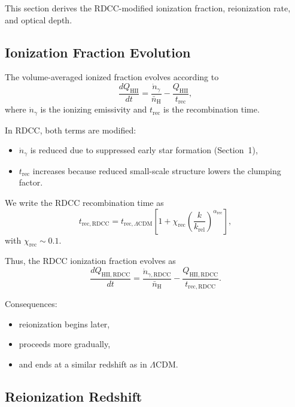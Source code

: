 \documentclass[11pt,a4paper]{article}
\begin{document}
This section derives the RDCC-modified ionization fraction, reionization rate, and optical
depth.

\subsection{Ionization Fraction Evolution}

The volume-averaged ionized fraction evolves according to
\begin{equation}
\frac{dQ_{\mathrm{HII}}}{dt}
=
\frac{\dot{n}_{\gamma}}{\bar{n}_{\mathrm{H}}}
-
\frac{Q_{\mathrm{HII}}}{t_{\mathrm{rec}}},
\end{equation}
where $\dot{n}_{\gamma}$ is the ionizing emissivity and $t_{\mathrm{rec}}$ is the recombination time.

In RDCC, both terms are modified:
\begin{itemize}
\item $\dot{n}_{\gamma}$ is reduced due to suppressed early star formation (Section~1),
\item $t_{\mathrm{rec}}$ increases because reduced small-scale structure lowers the clumping factor.
\end{itemize}

We write the RDCC recombination time as
\begin{equation}
t_{\mathrm{rec,RDCC}}
=
t_{\mathrm{rec},\Lambda\mathrm{CDM}}
\left[
1
+
\chi_{\mathrm{rec}}
\left(
\frac{k}{k_{\mathrm{rel}}}
\right)^{\alpha_{\mathrm{rec}}}
\right],
\end{equation}
with $\chi_{\mathrm{rec}} \sim 0.1$.

Thus, the RDCC ionization fraction evolves as
\begin{equation}
\frac{dQ_{\mathrm{HII,RDCC}}}{dt}
=
\frac{\dot{n}_{\gamma,\mathrm{RDCC}}}{\bar{n}_{\mathrm{H}}}
-
\frac{Q_{\mathrm{HII,RDCC}}}{t_{\mathrm{rec,RDCC}}}.
\end{equation}

Consequences:
\begin{itemize}
\item reionization begins later,
\item proceeds more gradually,
\item and ends at a similar redshift as in $\Lambda$CDM.
\end{itemize}

\subsection{Reionization Redshift}
\end{document}
